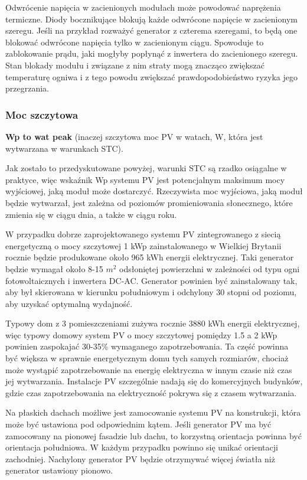 \documentclass[12pt,a4paper]{article}
\begin{document}
Odwrócenie napięcia w zacienionych modułach może powodować naprężenia 
termiczne. Diody bocznikujące blokują każde odwrócone napięcie w 
zacienionym szeregu. Jeśli na przykład rozważyć generator z czterema 
szeregami, to będą one blokować odwrócone napięcia tylko w zacienionym 
ciągu. Spowoduje to zablokowanie prądu, jaki mogłyby popłynąć z 
inwertera do zacienionego szeregu. Stan blokady modułu i związane z nim 
straty mogą znacząco zwiększać temperaturę ogniwa i z tego powodu 
zwiększać prawdopodobieństwo ryzyka jego przegrzania. 
\subsubsection{Moc szczytowa} 

\textbf{Wp to wat peak} (inaczej szczytowa moc PV w watach, W, która 
jest wytwarzana w warunkach STC). 

Jak zostało to przedyskutowane powyżej, warunki STC są rzadko osiągalne 
w praktyce, więc wskaźnik Wp systemu PV jest potencjalnym maksimum mocy 
wyjściowej, jaką moduł może dostarczyć. Rzeczywista moc wyjściowa, jaką 
moduł będzie wytwarzał, jest zależna od poziomów promieniowania 
słonecznego, które zmienia się w ciągu dnia, a także w ciągu roku. 

W przypadku dobrze zaprojektowanego systemu PV zintegrowanego z siecią 
energetyczną o mocy szczytowej 1 kWp zainstalowanego w Wielkiej Brytanii 
rocznie będzie produkowane około 965 kWh energii elektrycznej. Taki 
generator będzie wymagał około 8-15 ${m^{2}}$ odsłoniętej powierzchni w 
zależności od typu ogni fotowoltaicznych i inwertera DC-AC. Generator 
powinien być zainstalowany tak, aby był skierowana w kierunku 
południowym i odchylony 30 stopni od poziomu, aby uzyskać optymalną 
wydajność. 

Typowy dom z 3 pomieszczeniami zużywa rocznie 3880 kWh energii 
elektrycznej, więc typowy domowy system PV o mocy szczytowej pomiędzy 
1.5 a 2 kWp powinien zaspokajać 30-35\% wymaganego zapotrzebowania. Ta 
część powinna być większa w sprawnie energetycznym domu tych samych 
rozmiarów, chociaż może wystąpić zapotrzebowanie na energię elektryczna 
w innym czasie niż czas jej wytwarzania. Instalacje PV szczególnie 
nadają się do komercyjnych budynków, gdzie czas zapotrzebowania na 
elektryczność pokrywa się z czasem wytwarzania. 

Na płaskich dachach możliwe jest zamocowanie systemu PV na konstrukcji, 
która może być ustawiona pod odpowiednim kątem. Jeśli generator PV ma 
być zamocowany na pionowej fasadzie lub dachu, to korzystną orientacja 
powinna być orientacja południowa. W każdym przypadku powinno się unikać 
orientacji zachodniej. Nachylony generator PV będzie otrzymywać więcej 
światła niż generator ustawiony pionowo. 
\end{document}
